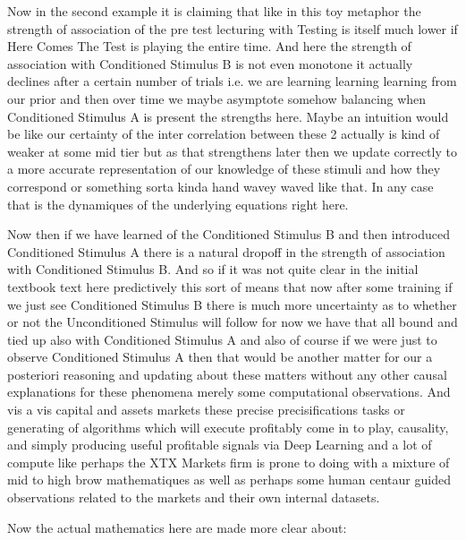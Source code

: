 Now in the second example it is claiming that like in this toy metaphor the strength of association of the pre test lecturing with Testing is itself much lower if Here Comes The Test is playing the entire time. And here the strength of association with Conditioned Stimulus B is not even monotone it actually declines after a certain number of trials i.e. we are learning learning learning from our prior and then over time we maybe asymptote somehow balancing when Conditioned Stimulus A is present the strengths here. Maybe an intuition would be like our certainty of the inter correlation between these 2 actually is kind of weaker at some mid tier but as that strengthens later then we update correctly to a more accurate representation of our knowledge of these stimuli and how they correspond or something sorta kinda hand wavey waved like that. In any case that is the dynamiques of the underlying equations right here.

Now then if we have learned of the Conditioned Stimulus B and then introduced Conditioned Stimulus A there is a natural dropoff in the strength of association with Conditioned Stimulus B. And so if it was not quite clear in the initial textbook text here predictively this sort of means that now after some training if we just see Conditioned Stimulus B there is much more uncertainty as to whether or not the Unconditioned Stimulus will follow for now we have that all bound and tied up also with Conditioned Stimulus A and also of course if we were just to observe Conditioned Stimulus A then that would be another matter for our a posteriori reasoning and updating about these matters without any other causal explanations for these phenomena merely some computational observations. And vis a vis capital and assets markets these precise precisifications tasks or generating of algorithms which will execute profitably come in to play, causality, and simply producing useful profitable signals via Deep Learning and a lot of compute like perhaps the XTX Markets firm is prone to doing with a mixture of mid to high brow mathematiques as well as perhaps some human centaur guided observations related to the markets and their own internal datasets.

Now the actual mathematics here are made more clear about:

